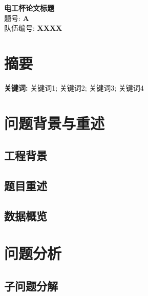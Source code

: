 \documentclass[12pt,a4paper]{ctexart}
\begin{document}
\begin{titlepage}
\begin{center}
\vspace*{2cm}
{\Huge \textbf{电工杯论文标题}}\\[2cm]
{\Large 题号: \textbf{A}}\\[1cm]
{\Large 队伍编号: \textbf{XXXX}}\\[3cm]
\end{center}
\end{titlepage}

\section*{摘要}


\textbf{关键词:} 关键词1; 关键词2; 关键词3; 关键词4

\newpage
\tableofcontents
\newpage


\section{问题背景与重述}

\subsection{工程背景}

\subsection{题目重述}

\subsection{数据概览}

\section{问题分析}

\subsection{子问题分解}
\end{document}
